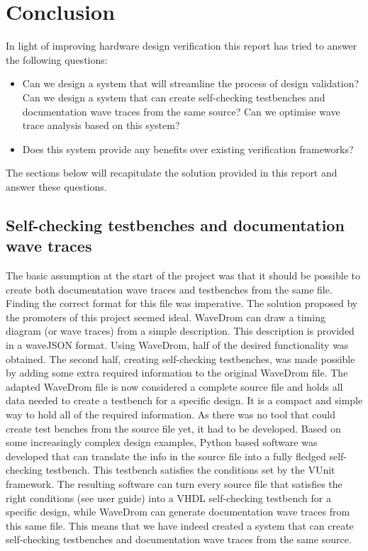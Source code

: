 
\chapter{Conclusion}
In light of improving hardware design verification this report has tried to answer the following questions:
\begin{itemize}
	\item Can we design a system that will streamline the process of design validation?
	\subitem Can we design a system that can create self-checking testbenches and \subsubitem documentation wave traces from the same source?
	\subitem Can we optimise wave trace analysis based on this system?
	\item Does this system provide any benefits over existing verification frameworks?	
\end{itemize}
The sections below will recapitulate the solution provided in this report and answer these questions.
\section{Self-checking testbenches and documentation wave traces}
The basic assumption at the start of the project was that it should be possible to create both documentation wave traces and testbenches from the same file. Finding the correct format for this file was imperative. The solution proposed by the promoters of this project seemed ideal. WaveDrom can draw a timing diagram (or wave traces) from a simple description. This description is provided in a waveJSON format. Using WaveDrom, half of the desired functionality was obtained. The second half, creating self-checking testbenches, was made possible by adding some extra required information to the original WaveDrom file. The adapted WaveDrom file is now considered a complete source file and holds all data needed to create a testbench for a specific design. It is a compact and simple way to hold all of the required information.
\npar
As there was no tool that could create test benches from the source file yet, it had to be developed. Based on some increasingly complex design examples, Python based software was developed that can translate the info in the source file into a fully fledged self-checking testbench. This testbench satisfies the conditions set by the VUnit framework.
\npar
The resulting software can turn every source file that satisfies the right conditions (see user guide) into a VHDL self-checking testbench for a specific design, while WaveDrom can generate documentation wave traces from this same file. This means that we have indeed created a system that can create self-checking testbenches and documentation wave traces from the same source.
